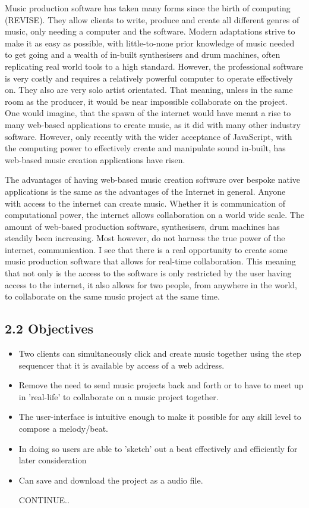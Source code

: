 \documentclass[a4paper]{article}
\begin{document}
Music production software has taken many forms since the birth of computing (REVISE). They allow clients to write, produce and create all different genres of music, only needing a computer and the software. Modern adaptations strive to make it as easy as possible, with little-to-none prior knowledge of music needed to get going and a wealth of in-built synthesisers and drum machines, often replicating real world tools to a high standard. However, the professional software is very costly and requires a relatively powerful computer to operate effectively on. They also are very solo artist orientated. That meaning, unless in the same room as the producer, it would be near impossible collaborate on the project. One would imagine, that the spawn of the internet would have meant a rise to many web-based applications to create music, as it did with many other industry software. However, only recently with the wider acceptance of JavaScript, with the computing power to effectively create and manipulate sound in-built, has web-based music creation applications have risen. \par

The advantages of having web-based music creation software over bespoke native applications is the same as the advantages of the Internet in general. Anyone with access to the internet can create music. Whether it is communication of computational power, the internet allows collaboration on a world wide scale. The amount of web-based production software, synthesisers, drum machines has steadily been increasing. Most however, do not harness the true power of the internet, communication. I see that there is a real opportunity to create some music production software that allows for real-time collaboration. This meaning that not only is the access to the software is only restricted by the user having access to the internet, it also allows for two people, from anywhere in the world, to collaborate on the same music project at the same time.

\subsection{2.2 Objectives}

\begin{itemize}
    \item[$\alph$] Two clients can simultaneously click and create music together using the step sequencer that it is available by access of a web address.
    \item[$\alph$] Remove the need to send music projects back and forth or to have to meet up in 'real-life' to collaborate on a music project together.
    \item[$\alph$] The user-interface is intuitive enough to make it possible for any skill level to compose a melody/beat.
    \item[$\alph$] In doing so users are able to 'sketch' out a beat effectively and efficiently for later consideration
    \item[$\alph$] Can save and download the project as a audio file.

        CONTINUE..

\end{itemize}
\end{document}

